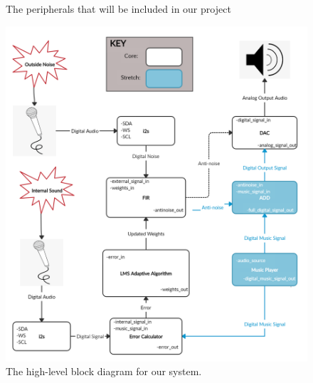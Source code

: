 \documentclass[12pt]{fpgairpods}
\begin{document}
\begin{multicols}{2}
\end{multicols}


\begin{figure}
\def\svgwidth{\linewidth}

\caption{The peripherals that will be included in our project}
\label{fig:peripherals}
\end{figure}

\begin{figure}
\includegraphics[width=\textwidth]{docs/proposal/figs/Proposal Block Diagram.png}
\caption{The high-level block diagram for our system.}
\label{fig:blockdiagram}
\end{figure}


\newpage
\end{document}
